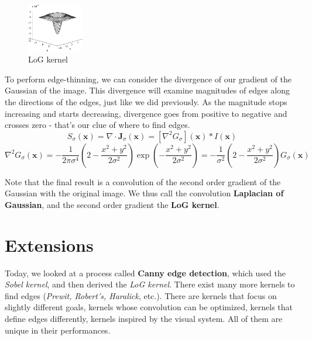 \documentclass{article}
\begin{document}
\begin{figure}
  \begin{center}
    \vspace{-30pt}
    \includegraphics[width=0.22\textwidth]{log.png}
    \vspace{-17.5pt}
  \end{center}
  \caption{LoG kernel}
  \vspace{-0pt}
\end{figure}
To perform edge-thinning, we can consider the divergence of our gradient of the Gaussian of the image. This divergence will examine magnitudes of edges along the directions of the edges, just like we did previously. As the magnitude stops increasing and starts decreasing, divergence goes from positive to negative and crosses zero - that's our clue of where to find edges.
\[S _ { \sigma } ( \boldsymbol { x } ) = \nabla \cdot \boldsymbol { J } _ { \sigma } ( \boldsymbol { x } ) = \left[ \nabla ^ { 2 } G _ { \sigma } \right] ( \boldsymbol { x } ) * I ( \boldsymbol { x } )\]
\[\nabla ^ { 2 } G _ { \sigma } ( \boldsymbol { x } ) = -\frac { 1 } { 2 \pi \sigma ^ { 4 } } \left( 2 - \frac { x ^ { 2 } + y ^ { 2 } } { 2 \sigma ^ { 2 } } \right) \exp \left( - \frac { x ^ { 2 } + y ^ { 2 } } { 2 \sigma ^ { 2 } } \right) = -\frac { 1 } { \sigma ^ { 2 } } \left( 2 - \frac { x ^ { 2 } + y ^ { 2 } } { 2 \sigma ^ { 2 } } \right) G _ { \sigma } ( \boldsymbol { x } )\]

Note that the final result is a convolution of the second order gradient of the Gaussian with the original image. We thus call the convolution \textbf{Laplacian of Gaussian}, and the second order gradient the \textbf{LoG kernel}.

\section{Extensions}
Today, we looked at a process called \textbf{Canny edge detection}, which used the \textit{Sobel kernel}, and then derived the \textit{LoG kernel}. There exist many more kernels to find edges (\textit{Prewit, Robert's, Haralick}, etc.). There are kernels that focus on slightly different goals, kernels whose convolution can be optimized, kernels that define edges differently, kernels inspired by the visual system. All of them are unique in their performances.
\end{document}
